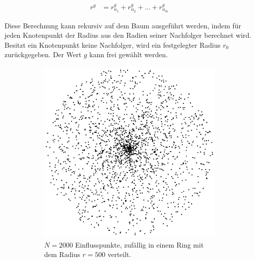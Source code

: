 \begin{equation}
\begin{array}{ll}
r^g & = r_{n_1}^g + r_{n_2}^g + ... + r_{n_m}^g 
\end{array}
\end{equation} 

Diese Berechnung kann rekursiv auf dem Baum ausgeführt werden, indem für jeden Knotenpunkt der Radius aus den Radien seiner Nachfolger berechnet wird. Besitzt ein Knotenpunkt keine Nachfolger, wird ein festgelegter Radius $r_0$ zurückgegeben. \cite[Abschn. 3.5]{LeafVenation:05} Der Wert $g$ kann frei gewählt werden.

\begin{figure} [hbtp]
	\centering
	\begin{subfigure}[t]{.4\textwidth}
		\centering
		\includegraphics[width=\linewidth]{images/SCA_Extended1.png}
		\caption{$N=2000$ Einflusspunkte, zufällig in einem Ring mit dem Radius $r = 500$ verteilt.}
		\label{subfig:SCA_Extended1}
	\end{subfigure}
	\hspace{.1\textwidth}
	\begin{subfigure}[t]{.4\textwidth}
		\centering

\end{subfigure}
\end{figure}

